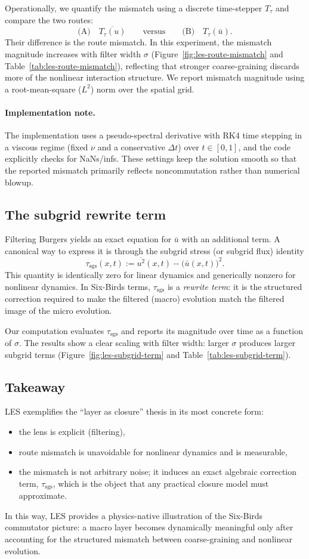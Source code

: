 \documentclass[11pt]{article}
\begin{document}
Operationally, we quantify the mismatch using a discrete time-stepper $T_\tau$ and compare the two routes:
\[
  \text{(A)}\quad \overline{T_\tau(u)} \qquad \text{versus}\qquad
  \text{(B)}\quad T_\tau(\bar{u}).
\]
Their difference is the route mismatch. In this experiment, the mismatch magnitude increases with filter width $\sigma$ (Figure~\ref{fig:les-route-mismatch} and Table~\ref{tab:les-route-mismatch}), reflecting that stronger coarse-graining discards more of the nonlinear interaction structure.
We report mismatch magnitude using a root-mean-square ($L^2$) norm over the spatial grid.
\paragraph{Implementation note.}
The implementation uses a pseudo-spectral derivative with RK4 time stepping in a viscous regime (fixed $\nu$ and a conservative $\Delta t$) over $t\in[0,1]$, and the code explicitly checks for NaNs/infs.
These settings keep the solution smooth so that the reported mismatch primarily reflects noncommutation rather than numerical blowup.

\subsection{The subgrid rewrite term}
Filtering Burgers yields an exact equation for $\bar{u}$ with an additional term. A canonical way to express it is through the subgrid stress (or subgrid flux) identity
\[
  \tau_{\mathrm{sgs}}(x,t) := \overline{u^2}(x,t) - \bigl(\bar{u}(x,t)\bigr)^2.
\]
This quantity is identically zero for linear dynamics and generically nonzero for nonlinear dynamics. In Six-Birds terms, $\tau_{\mathrm{sgs}}$ is a \emph{rewrite term}: it is the structured correction required to make the filtered (macro) evolution match the filtered image of the micro evolution.

Our computation evaluates $\tau_{\mathrm{sgs}}$ and reports its magnitude over time as a function of $\sigma$. The results show a clear scaling with filter width: larger $\sigma$ produces larger subgrid terms (Figure~\ref{fig:les-subgrid-term} and Table~\ref{tab:les-subgrid-term}).

\subsection{Takeaway}
LES exemplifies the ``layer as closure'' thesis in its most concrete form:
\begin{itemize}
  \item the lens is explicit (filtering),
  \item route mismatch is unavoidable for nonlinear dynamics and is measurable,
  \item the mismatch is not arbitrary noise; it induces an exact algebraic correction term, $\tau_{\mathrm{sgs}}$, which is the object that any practical closure model must approximate.
\end{itemize}
In this way, LES provides a physics-native illustration of the Six-Birds commutator picture: a macro layer becomes dynamically meaningful only after accounting for the structured mismatch between coarse-graining and nonlinear evolution.
\end{document}
